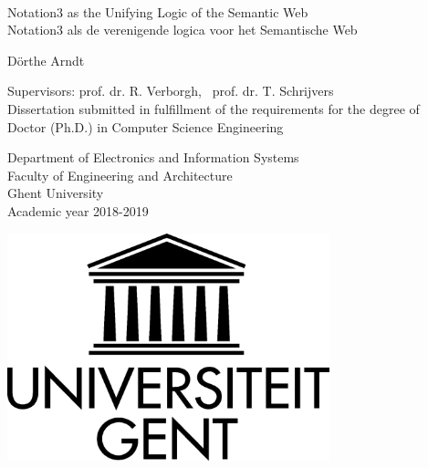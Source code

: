 
{\large \ \vspace{0.25\textheight} \\

\hspace{-\parindent}Notation3 as the Unifying Logic of the Semantic Web\\

\hspace{-\parindent}Notation3 als de verenigende logica voor het Semantische Web


\vspace{0.5cm}
\hspace{-\parindent}D\"orthe Arndt

}

\vspace*{\fill}
\hspace{-\parindent}Supervisors: prof. dr. R. Verborgh,~ prof. dr. T. Schrijvers\\
\hspace{-\parindent}Dissertation submitted in fulfillment of the requirements for the degree of\\
\hspace{-\parindent}Doctor (Ph.D.) in Computer Science Engineering\\


\vspace{0.5cm}

\hspace{-\parindent}\begin{minipage}{0.7\textwidth}
  \hspace{-\parindent}Department of Electronics and Information Systems\\
  \hspace{-\parindent}Faculty of Engineering and Architecture\\
  \hspace{-\parindent}Ghent University\\
  \hspace{-\parindent}Academic year 2018-2019
\end{minipage}
\begin{minipage}{0.3\textwidth}
  \begin{flushright}
    \includegraphics[width=0.7\textwidth]{./figures/logo-ugent}
  \end{flushright}
\end{minipage}

